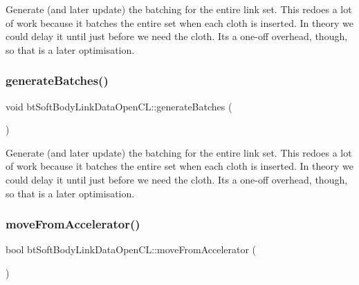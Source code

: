 Generate (and later update) the batching for the entire link set. This redoes a lot of work because it batches the entire set when each cloth is inserted. In theory we could delay it until just before we need the cloth. It\textquotesingle{}s a one-\/off overhead, though, so that is a later optimisation. \mbox{\label{classbtSoftBodyLinkDataOpenCL_a4e968e65bfa4b5b1691a83fdee3ce48f}} 
\subsubsection{\texorpdfstring{generate\+Batches()}{generateBatches()}\hspace{0.1cm}{\footnotesize\ttfamily [2/2]}}
{\footnotesize\ttfamily void bt\+Soft\+Body\+Link\+Data\+Open\+C\+L\+::generate\+Batches (\begin{DoxyParamCaption}{ }\end{DoxyParamCaption})}

Generate (and later update) the batching for the entire link set. This redoes a lot of work because it batches the entire set when each cloth is inserted. In theory we could delay it until just before we need the cloth. It\textquotesingle{}s a one-\/off overhead, though, so that is a later optimisation. \mbox{\label{classbtSoftBodyLinkDataOpenCL_a47cc8710e80d8e3d00775960c358058d}} 
\subsubsection{\texorpdfstring{move\+From\+Accelerator()}{moveFromAccelerator()}\hspace{0.1cm}{\footnotesize\ttfamily [1/2]}}
{\footnotesize\ttfamily bool bt\+Soft\+Body\+Link\+Data\+Open\+C\+L\+::move\+From\+Accelerator (\begin{DoxyParamCaption}{ }\end{DoxyParamCaption})\hspace{0.3cm}{\ttfamily [virtual]}}


